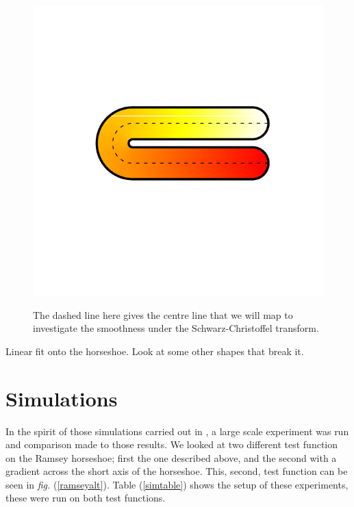 \documentclass[a4paper,10pt]{amsart}
\newcommand{\sch}{Schwarz-Christoffel }
\newcommand{\fig}[1]{\emph{fig.} (\ref{#1})}
\begin{document}
\begin{figure}
\centering
\includegraphics[trim=0in 1.5in 0in 1.5in]{figs/horseshoecentreline.pdf} \\
\caption{The dashed line here gives the centre line that we will map to investigate the smoothness under the \sch transform.}
\label{horseshoecentreline}
\end{figure}



Linear fit onto the horseshoe.
Look at some other shapes that break it.


\section{Simulations}

In the spirit of those simulations carried out in \cite{soap}, a large scale experiment was run and comparison made to those results. We looked at two different test function on the Ramsey horseshoe; first the one described above, and the second with a gradient across the short axis of the horseshoe. This, second, test function can be seen in \fig{ramseyalt}. Table (\ref{simtable}) shows the setup of these experiments, these were run on both test functions.
\end{document}
